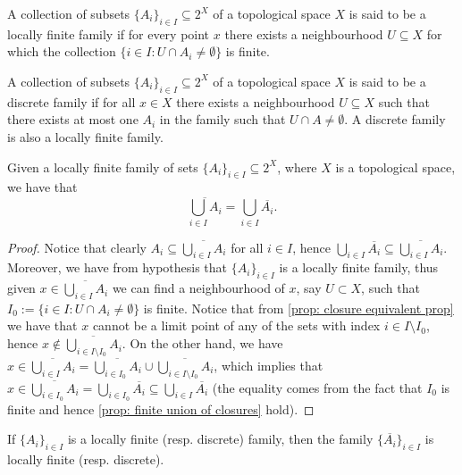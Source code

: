 \begin{definition}
A collection of subsets \(\{A_i\}_{i \in I} \subseteq 2^X\) of a topological
space \(X\) is said to be a locally finite family if for every point \(x\)
there exists a neighbourhood \(U \subseteq X\) for which the collection \(\{i
\in I: U \cap A_i \neq \emptyset\}\) is finite.
\end{definition}

\begin{definition}
A collection of subsets \(\{A_i\}_{i \in I} \subseteq 2^X\) of a topological
space \(X\) is said to be a discrete family if for all \(x \in X\) there
exists a neighbourhood \(U \subseteq X\) such that there exists at most one
\(A_i\) in the family such that \(U \cap A \neq \emptyset\). A discrete family
is also a locally finite family.
\end{definition}

\begin{proposition}
Given a locally finite family of sets \(\{A_i\}_{i \in I} \subseteq 2^X\),
where \(X\) is a topological space, we have that
\[
  \overline{\bigcup_{i \in  I} A_i} = \bigcup_{i \in  I} \overline{A_i}.
\]
\end{proposition}

\begin{proof}
Notice that clearly \(A_i \subseteq \overline{\bigcup_{i \in  I} A_i}\) for
all \(i \in I\), hence \(\bigcup_{i \in  I} \overline{A_i} \subseteq
\overline{\bigcup_{i \in I} A_i}\). Moreover, we have from hypothesis that
\(\{A_i\}_{i \in I}\) is a locally finite family, thus given \(x \in
\overline{\bigcup_{i \in  I} A_i}\) we can find a neighbourhood of \(x\), say
\(U \subset X\), such that \(I_0 := \{i \in I : U \cap A_i \neq \emptyset\}\)
is finite. Notice that from \cref{prop: closure equivalent prop} we have that
\(x\) cannot be a limit point of any of the sets with index \(i \in I
\setminus I_0\), hence \(x \not\in \overline{\bigcup_{i \in  I \setminus I_0}
A_i}\). On the other hand, we have \(x \in \overline{\bigcup_{i \in  I} A_i} =
\overline{\bigcup_{i \in  I_0} A_i} \cup \overline{\bigcup_{i \in  I \setminus
I_0} A_i}\), which implies that \(x \in \overline{\bigcup_{i \in  I_0} A_i} =
\bigcup_{i \in  I_0} \overline{A_i} \subseteq \bigcup_{i \in  I}
\overline{A_i}\) (the equality comes from the fact that \(I_0\) is finite and
hence \cref{prop: finite union of closures} hold).
\end{proof}

\begin{proposition}
If \(\{A_i\}_{i \in I}\) is a locally finite (resp. discrete) family, then the
family \(\{\overline{A_i}\}_{i \in I}\) is locally finite (resp. discrete).
\end{proposition}

